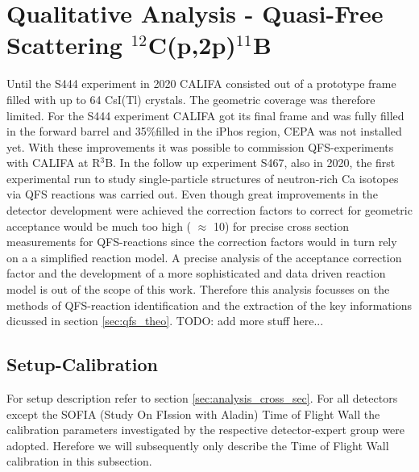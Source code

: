 \section{Qualitative Analysis - Quasi-Free Scattering $^{12}$C(p,2p)$^{11}$B}
Until the S444 experiment in 2020 CALIFA consisted out of a prototype frame filled with up to 64 CsI(Tl) crystals. The geometric coverage was therefore limited. For the S444 experiment CALIFA got its final frame and was fully filled in the forward barrel and 35\%filled in the iPhos region, CEPA was not installed yet. With these improvements it was possible to commission QFS-experiments with CALIFA at R$^3$B. In the follow up experiment S467, also in 2020, the first experimental run to study single-particle structures of neutron-rich Ca isotopes via QFS reactions was carried out.\newline
Even though great improvements in the detector development  were achieved the correction factors to correct for geometric acceptance would be much too high ( $\approx$ 10) for precise cross section measurements for QFS-reactions since the correction factors would in turn rely on a a simplified reaction model. A precise analysis of the acceptance correction factor and the development of a more sophisticated and data driven reaction model is out of the scope of this work. Therefore this analysis focusses on the methods of QFS-reaction identification and the extraction of the key informations dicussed in section \ref{sec:qfs_theo}. TODO: add more stuff here...\newline
\subsection{Setup-Calibration}
For setup description refer to section \ref{sec:analysis_cross_sec}. For all detectors except the SOFIA (Study On FIssion with Aladin) Time of Flight Wall the calibration parameters investigated by the respective detector-expert group were adopted. Herefore we will subsequently only describe the Time of Flight Wall calibration in this subsection.
